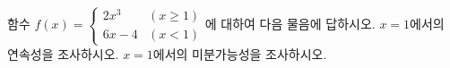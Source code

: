 함수 $f(x)=\begin{cases} 2x^3 & (x\ge 1) \\ 6x-4 & (x<1) \end{cases}$에 대하여 다음 물음에 답하시오.
 $x=1$에서의 연속성을 조사하시오.
 $x=1$에서의 미분가능성을 조사하시오.
